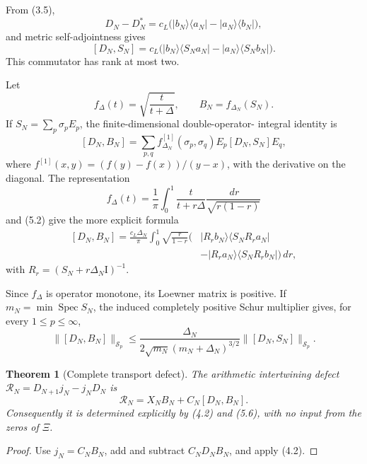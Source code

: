 \documentclass[11pt]{amsart}
\newtheorem{theorem}{Theorem}[section]
\theoremstyle{definition}
\theoremstyle{remark}
\newcommand{\Schatten}{\mathcal S}
\newcommand{\Spec}{\operatorname{Spec}}
\newcommand{\id}{\mathrm I}
\newcommand{\XiR}{\Xi}
\newcommand{\dd}{\,d}
\begin{document}
From (3.5),
\[
 D_N-D_N^*
 =c_L\bigl(|b_N\rangle\langle a_N|-|a_N\rangle\langle b_N|\bigr),
\tag{5.1}
\]
and metric self-adjointness gives
\[
\boxed{
[D_N,S_N]
=c_L\bigl(|b_N\rangle\langle S_Na_N|
          -|a_N\rangle\langle S_Nb_N|\bigr).}
\tag{5.2}
\]
This commutator has rank at most two.

Let
\[
 f_\Delta(t)=\sqrt{\frac{t}{t+\Delta}},
 \qquad B_N=f_{\Delta_N}(S_N).
\tag{5.3}
\]
If \(S_N=\sum_p\sigma_pE_p\), the finite-dimensional double-operator-
integral identity is
\[
\boxed{
[D_N,B_N]
=\sum_{p,q}f_{\Delta_N}^{[1]}(\sigma_p,\sigma_q)
 E_p[D_N,S_N]E_q,}
\tag{5.4}
\]
where \(f^{[1]}(x,y)=(f(y)-f(x))/(y-x)\), with the derivative on the
diagonal.  The representation
\[
 f_\Delta(t)=\frac1\pi\int_0^1
 \frac{t}{t+r\Delta}\frac{\dd r}{\sqrt{r(1-r)}}
\tag{5.5}
\]
and (5.2) give the more explicit formula
\[
\boxed{
\begin{aligned}
[D_N,B_N]
=\frac{c_L\Delta_N}{\pi}\int_0^1\sqrt{\frac r{1-r}}
\bigl(&|R_rb_N\rangle\langle S_NR_ra_N|\\
      &-|R_ra_N\rangle\langle S_NR_rb_N|\bigr)\dd r,
\end{aligned}}
\tag{5.6}
\]
with \(R_r=(S_N+r\Delta_N\id)^{-1}\).

Since \(f_\Delta\) is operator monotone, its Loewner matrix is positive.
If \(m_N=\min\Spec S_N\), the induced completely positive Schur multiplier
gives, for every \(1\le p\le\infty\),
\[
\boxed{
 \|[D_N,B_N]\|_{\Schatten_p}
 \le
 \frac{\Delta_N}
 {2\sqrt{m_N}(m_N+\Delta_N)^{3/2}}
 \|[D_N,S_N]\|_{\Schatten_p}.}
\tag{5.7}
\]

\begin{theorem}[Complete transport defect]
The arithmetic intertwining defect
\(\mathcal R_N=D_{N+1}j_N-j_ND_N\) is
\[
\boxed{\mathcal R_N=X_NB_N+C_N[D_N,B_N].}
\tag{5.8}
\]
Consequently it is determined explicitly by (4.2) and (5.6), with no input
from the zeros of \(\XiR\).
\end{theorem}

\begin{proof}
Use \(j_N=C_NB_N\), add and subtract \(C_ND_NB_N\), and apply (4.2).
\end{proof}
\end{document}
